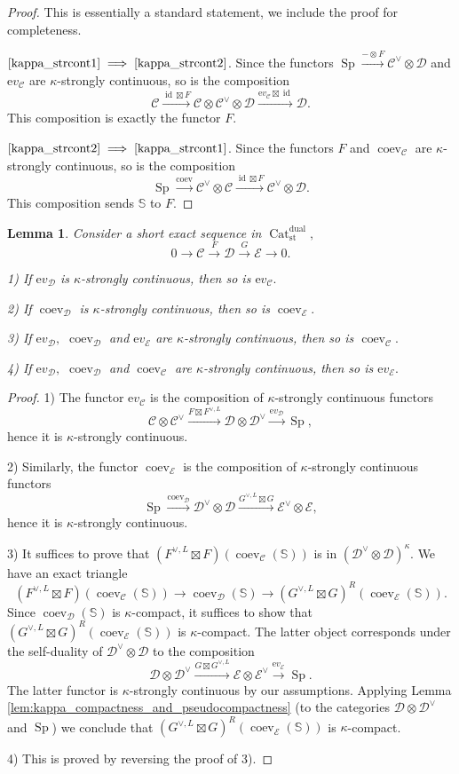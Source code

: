 \documentclass[11pt,leqno]{amsart}
\newcommand{\Implies}[2]{$\text{\ref{#1}}\implies\text{\ref{#2}}$}
\newtheorem{lemma}[theo]{Lemma}
\numberwithin{equation}{section}
\def\bS{\mathbb{S}}
\newcommand{\xto}{\xrightarrow}
\newcommand{\Cat}{\operatorname{Cat}}
\newcommand{\st}{\operatorname{st}}
\newcommand{\dual}{\operatorname{dual}}
\newcommand{\ev}{\mathrm ev}
\newcommand{\cD}{{\mathcal D}}
\newcommand{\cC}{{\mathcal C}}
\newcommand{\cE}{{\mathcal E}}
\newcommand{\Sp}{\operatorname{Sp}}
\newcommand{\id}{\operatorname{id}}
\newcommand{\coev}{\operatorname{coev}}
\begin{document}
\begin{proof}This is essentially a standard statement, we include the proof for completeness.

\Implies{kappa_strcont1}{kappa_strcont2}. Since the functors $\Sp\xto{-\otimes F}\cC^{\vee}\otimes\cD$ and $\ev_{\cC}$ are $\kappa$-strongly continuous, so is the composition
$$\cC\xto{\id\boxtimes F} \cC\otimes\cC^{\vee}\otimes\cD\xto{\ev_{\cC}\boxtimes\id} \cD.$$
This composition is exactly the functor $F.$

\Implies{kappa_strcont2}{kappa_strcont1}. Since the functors $F$ and $\coev_{\cC}$ are $\kappa$-strongly continuous, so is the composition
$$\Sp\xto{\coev}\cC^{\vee}\otimes\cC\xto{\id\boxtimes F}\cC^{\vee}\otimes\cD.$$
This composition sends $\bS$ to $F.$\end{proof}

\begin{lemma}\label{lem:kappa_compactness_for_ev_and_coev}  Consider a short exact sequence in $\Cat_{\st}^{\dual},$
$$0\to\cC\xto{F} \cD\xto{G} \cE\to 0.$$

1) If $\ev_{\cD}$ is $\kappa$-strongly continuous, then so is $\ev_{\cC}.$

2) If $\coev_{\cD}$ is $\kappa$-strongly continuous, then so is $\coev_{\cE}.$

3) If $\ev_{\cD},$ $\coev_{\cD}$ and $\ev_{\cE}$ are $\kappa$-strongly continuous, then so is $\coev_{\cC}.$

4) If $\ev_{\cD},$ $\coev_{\cD}$ and $\coev_{\cC}$ are $\kappa$-strongly continuous, then so is $\ev_{\cE}.$
\end{lemma}

\begin{proof}1) The functor $\ev_{\cC}$ is the composition of $\kappa$-strongly continuous functors
$$\cC\otimes\cC^{\vee}\xto{F\boxtimes F^{\vee,L}} \cD\otimes\cD^{\vee}\xto{\ev_{\cD}} \Sp,$$
hence it is $\kappa$-strongly continuous.

2) Similarly, the functor $\coev_{\cE}$ is the composition of $\kappa$-strongly continuous functors 
$$\Sp\xto{\coev_{\cD}}\cD^{\vee}\otimes\cD\xto{G^{\vee,L}\boxtimes G}\cE^{\vee}\otimes\cE,$$
hence it is $\kappa$-strongly continuous.

3) It suffices to prove that $(F^{\vee,L}\boxtimes F)(\coev_{\cC}(\bS))$ is in $(\cD^{\vee}\otimes\cD)^{\kappa}.$ We have an exact triangle
$$(F^{\vee,L}\boxtimes F)(\coev_{\cC}(\bS))\to\coev_{\cD}(\bS)\to (G^{\vee,L}\boxtimes G)^R(\coev_{\cE}(\bS)).$$
Since $\coev_{\cD}(\bS)$ is $\kappa$-compact, it suffices to show that $(G^{\vee,L}\boxtimes G)^R(\coev_{\cE}(\bS))$ is $\kappa$-compact.  The latter object corresponds under the self-duality of $\cD^{\vee}\otimes\cD$ to the composition $$\cD\otimes\cD^{\vee}\xto{G\boxtimes G^{\vee,L}}\cE\otimes\cE^{\vee}\xto{\ev_{\cE}}\Sp.$$ The latter functor is $\kappa$-strongly continuous by our assumptions. Applying Lemma \ref{lem:kappa_compactness_and_pseudocompactness} (to the categories $\cD\otimes\cD^{\vee}$ and $\Sp$) we conclude that $(G^{\vee,L}\boxtimes G)^R(\coev_{\cE}(\bS))$ is $\kappa$-compact.

4) This is proved by reversing the proof of 3).\end{proof}
\end{document}
